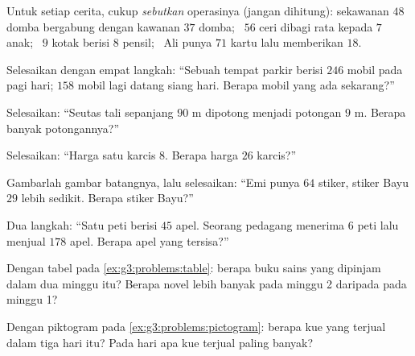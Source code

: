 \begin{exercise}[$\star$]\label{exo:g3:problems:1}
Untuk setiap cerita, cukup \emph{sebutkan} operasinya (jangan
dihitung): sekawanan $48$ domba bergabung dengan kawanan $37$ domba;
\ $56$ ceri dibagi rata kepada $7$ anak; \ $9$ kotak berisi $8$
pensil; \ Ali punya $71$ kartu lalu memberikan $18$.
\end{exercise}

\begin{exercise}[$\star$]\label{exo:g3:problems:2}
Selesaikan dengan empat langkah: ``Sebuah tempat parkir berisi $246$
mobil pada pagi hari; $158$ mobil lagi datang siang hari. Berapa mobil yang ada sekarang?''
\end{exercise}

\begin{exercise}[$\star$]\label{exo:g3:problems:3}
Selesaikan: ``Seutas tali sepanjang $90$ m dipotong menjadi potongan
$9$ m. Berapa banyak potongannya?''
\end{exercise}

\begin{exercise}[$\star$]\label{exo:g3:problems:4}
Selesaikan: ``Harga satu karcis $8$. Berapa harga $26$ karcis?''
\end{exercise}

\begin{exercise}[$\star$]\label{exo:g3:problems:5}
Gambarlah gambar batangnya, lalu selesaikan: ``Emi punya $64$ stiker,
stiker Bayu $29$ lebih sedikit. Berapa stiker Bayu?''
\end{exercise}

\begin{exercise}[$\star$]\label{exo:g3:problems:6}
Dua langkah: ``Satu peti berisi $45$ apel. Seorang pedagang menerima
$6$ peti lalu menjual $178$ apel. Berapa apel yang tersisa?''
\end{exercise}

\begin{exercise}[$\star$]\label{exo:g3:problems:7}
Dengan tabel pada \cref{ex:g3:problems:table}: berapa buku sains
yang dipinjam dalam dua minggu itu? Berapa novel lebih banyak pada
minggu 2 daripada pada minggu 1?
\end{exercise}

\begin{exercise}[$\star$]\label{exo:g3:problems:8}
Dengan piktogram pada \cref{ex:g3:problems:pictogram}: berapa kue
yang terjual dalam tiga hari itu? Pada hari apa kue terjual paling
banyak?
\end{exercise}

